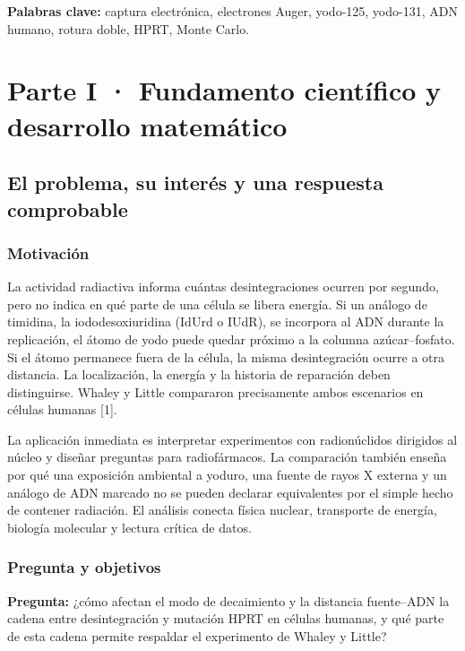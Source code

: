 \documentclass[11pt,a4paper,oneside]{article}
\begin{document}
\textbf{Palabras clave:} captura electrónica, electrones Auger, yodo-125, yodo-131, ADN humano, rotura doble, HPRT, Monte Carlo.

\section{Parte I · Fundamento científico y desarrollo matemático}\label{parte-i-fundamento-cientuxedfico-y-desarrollo-matemuxe1tico}

\subsection{El problema, su interés y una respuesta comprobable}\label{el-problema-su-interuxe9s-y-una-respuesta-comprobable}

\subsubsection{Motivación}\label{motivaciuxf3n}

La actividad radiactiva informa cuántas desintegraciones ocurren por segundo, pero no indica en qué parte de una célula se libera energía. Si un análogo de timidina, la iododesoxiuridina (IdUrd o IUdR), se incorpora al ADN durante la replicación, el átomo de yodo puede quedar próximo a la columna azúcar--fosfato. Si el átomo permanece fuera de la célula, la misma desintegración ocurre a otra distancia. La localización, la energía y la historia de reparación deben distinguirse. Whaley y Little compararon precisamente ambos escenarios en células humanas {[}1{]}.

La aplicación inmediata es interpretar experimentos con radionúclidos dirigidos al núcleo y diseñar preguntas para radiofármacos. La comparación también enseña por qué una exposición ambiental a yoduro, una fuente de rayos X externa y un análogo de ADN marcado no se pueden declarar equivalentes por el simple hecho de contener radiación. El análisis conecta física nuclear, transporte de energía, biología molecular y lectura crítica de datos.

\subsubsection{Pregunta y objetivos}\label{pregunta-y-objetivos}

\textbf{Pregunta:} ¿cómo afectan el modo de decaimiento y la distancia fuente--ADN la cadena entre desintegración y mutación HPRT en células humanas, y qué parte de esta cadena permite respaldar el experimento de Whaley y Little?
\end{document}
